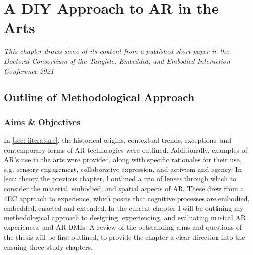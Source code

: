 \chapter{A DIY Approach to AR in the Arts}
\label{sec: method}
\epigraph{\emph{This chapter draws some of its content from a published short-paper in the Doctoral Consortium of the Tangible, Embedded, and Embodied Interaction Conference 2021}}{\citep[]{bilbow2021b}}


\section{Outline of Methodological Approach}\label{sec: method-outline}
\subsection{Aims \& Objectives}\label{sec: method-outline-aims}
In \autoref{sec: literature}, the historical origins, contextual trends, exceptions, and contemporary forms of AR technologies were outlined. Additionally, examples of AR's use in the arts were provided, along with specific rationales for their use, e.g. sensory engagement, collaborative expression, and activism and agency. In \autoref{sec: theory}{the previous chapter}, I outlined a trio of lenses through which to consider the material, embodied, and spatial aspects of AR. These drew from a 4EC approach to experience, which posits that cognitive processes are embodied, embedded, enacted and extended. In the current chapter I will be outlining my methodological approach to designing, experiencing, and evaluating musical AR experiences, and AR DMIs. A review of the outstanding aims and questions of the thesis will be first outlined, to provide the chapter a clear direction into the ensuing three study chapters.

\begin{enumerate}
    \RQmedium
    \RQexperience
    \RQfuture
\end{enumerate}





